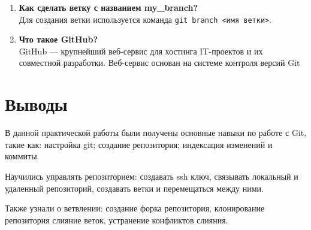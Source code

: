 \begin{enumerate}
{    git status?}\\
    Статус Untracked означает, что Git видит файл, которого не было
    в предыдущем снимке состояния (коммите); Git не станет добавлять
    его в коммиты, пока его явно об этом не попросить.
    \item \textbf{Как сделать ветку с названием my\_branch?}\\
    Для создания ветки используется команда \texttt{git branch <имя ветки>}.
    \item \textbf{Что такое GitHub?}\\
    GitHub — крупнейший веб-сервис для хостинга IT-проектов
    и их совместной разработки. Веб-сервис основан на системе
    контроля версий Git
\end{enumerate}

\chapter*{Выводы}
В данной практической работы были получены основные навыки по работе с Git,
такие как: настройка git; создание репозитория; индексация изменений и коммиты.

Научились управлять репозиторием: создавать ssh ключ, связывать локальный и
удаленный репозиторий, создавать ветки и перемещаться между ними.

Также узнали о ветвлении: создание форка репозитория, клонирование репозитория
слияние веток, устранение конфликтов слияния.